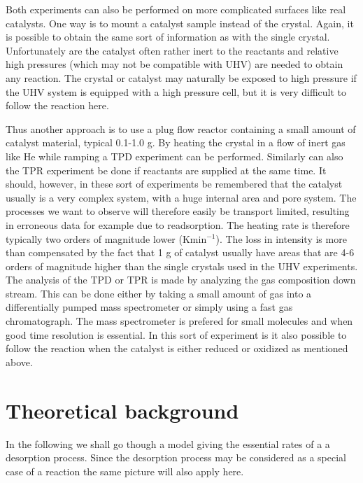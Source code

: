Both experiments can also be performed on more complicated surfaces like real catalysts. One way is to mount a catalyst sample instead of the crystal. Again,  it is possible to obtain the same sort of information as with the single crystal. Unfortunately are the catalyst often rather inert to the reactants and relative high pressures (which may not be compatible  with UHV) are needed to obtain any reaction. The crystal or catalyst may naturally be exposed to high pressure if the UHV system is equipped with a high pressure cell, but it is very difficult to follow the reaction here. 

Thus another approach is to use a plug flow reactor containing a small amount of catalyst material, typical 0.1-1.0 g.  By heating the crystal in a flow of inert gas like He while ramping a TPD experiment can be performed. Similarly can also the TPR experiment be done if reactants are supplied at the same time. It should, however, in these sort of experiments be remembered that the catalyst usually is a very complex system, with a huge internal area and pore system. The processes we want to observe will therefore easily be transport limited, resulting in erroneous data for example due to   readsorption. The heating rate is therefore typically two orders of magnitude lower (Kmin$^{-1}$). The loss in intensity is more than compensated by the fact that 1 g of catalyst usually have areas that are 4-6 orders of magnitude higher than the single crystals used in the UHV experiments. The analysis of the TPD or TPR is made by analyzing the gas composition down stream. This can be done either by taking a small amount of gas into a  differentially pumped mass  spectrometer  or simply using a fast gas chromatograph. The mass spectrometer is prefered for small molecules and when good time resolution is essential. In this sort of experiment is it also possible to follow the reaction when the catalyst is either reduced or oxidized as mentioned above.  



\section{Theoretical background}
In the following we shall go though a model giving the essential rates of a  a desorption process. Since the desorption process may be considered as a special case of a reaction the same  picture  will also apply here.

